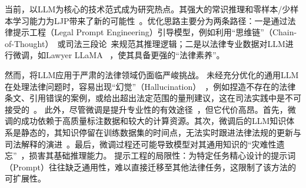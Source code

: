当前，以LLM为核心的技术范式成为研究热点。其强大的常识推理和零样本/少样本学习能力为LJP带来了新的可能性~\cite{brown2020language,huang2022towards}。优化思路主要分为两条路径：一是通过法律提示工程（Legal Prompt Engineering）引导模型，例如利用“思维链”（Chain-of-Thought）~\cite{kojima2022large,izacard2021leveraging}或司法三段论~\cite{huang2023lawyer}来规范其推理逻辑；二是以法律专业数据对LLM进行微调，如Lawyer LLaMA ~\cite{chen2020recall}，使其具备更强的“法律素养”。

然而，将LLM应用于严肃的法律领域仍面临严峻挑战。
未经充分优化的通用LLM在处理法律问题时，容易出现“幻觉”（Hallucination）~\cite{cui2023survey}，例如捏造不存在的法律条文、引用错误的案例，或给出超出法定范围的量刑建议，这在司法实践中是不可接受的~\cite{lewis2020retrieval}。
此外，尽管微调是提升专业性的有效途径~\cite{hu2021lora,hu2022lora}，但它代价高昂。首先，微调的成功依赖于高质量标注数据和较大的计算资源。其次，微调后的LLM知识体系是静态的，其知识停留在训练数据集的时间点，无法实时跟进法律法规的更新与司法解释的演进~\cite{li2021prefix}。最后，微调过程还可能导致模型对其通用知识的“灾难性遗忘”~\cite{chen2020recall}，损害其基础推理能力。
提示工程的局限性：为特定任务精心设计的提示词（Prompt）往往缺乏通用性，难以直接迁移至其他法律任务，这限制了该方法的可扩展性。
